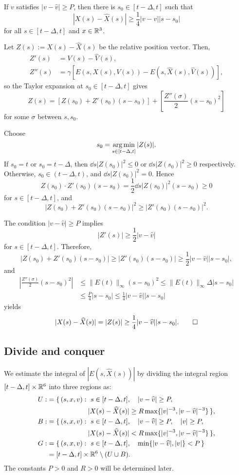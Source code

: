 \documentclass[11pt]{amsart}
\begin{document}
\begin{lem}
If $v$ satisfies $|v-\hat v|\ge P$, then there is $s_0\in[t-\Delta,t]$ such that
\[|X(s)-\hat X(s)|\ge\frac14|v-\hat v||s-s_0|\]
for all $s\in[t-\Delta,t]$ and $x\in\R^3$.
\end{lem}
\begin{pf}
Let $Z(s):=X(s)-\hat X(s)$ be the relative position vector.
Then,
\begin{align*}
Z'(s)&=V(s)-\hat V(s),\\
Z''(s)&=\gamma[E(s,X(s),V(s))-E(s,\hat X(s),\hat V(s))],
\end{align*}
so the Taylor expansion at $s_0\in[t-\Delta,t]$ gives
\[Z(s)=\left[Z(s_0)+Z'(s_0)(s-s_0)\right]+\left[\frac{Z''(\sigma)}2(s-s_0)^2\right]\]
for some $\sigma$ between $s,s_0$.

Choose
\[s_0=\argmin_{s\in[t-\Delta,t]}|Z(s)|.\]
If $s_0=t$ or $s_0=t-\Delta$, then $\dd{s}|Z(s_0)|^2\le0$ or $\dd{s}|Z(s_0)|^2\ge0$ respectively.
Otherwise, $s_0\in(t-\Delta,t)$, and $\dd{s}|Z(s_0)|^2=0$.
Hence
\[Z(s_0)\cdot Z'(s_0)(s-s_0)=\frac12\dd{s}|Z(s_0)|^2(s-s_0)\ge0\]
for $s\in[t-\Delta,t]$, and
\[|Z(s_0)+Z'(s_0)(s-s_0)|^2\ge|Z'(s_0)(s-s_0)|^2.\]

The condition $|v-\hat v|\ge P$ implies
\[|Z'(s)|\ge\frac12|v-\hat v|\]
for $s\in[t-\Delta,t]$.
Therefore,
\[|Z(s_0)+Z'(s_0)(s-s_0)|\ge|Z'(s_0)(s-s_0)|\ge\frac12|v-\hat v||s-s_0|,\]
and
\begin{align*}
|\frac{Z''(\sigma)}2(s-s_0)^2|
&\le\|E(t)\|_\infty(s-s_0)^2
\le\|E(t)\|_\infty\Delta|s-s_0|\\
&\le\frac P4|s-s_0|
\le\frac14|v-\hat v||s-s_0|
\end{align*}
yields
\[|X(s)-\hat X(s)|=|Z(s)|\ge\frac14|v-\hat v||s-s_0|.\qedhere\]
\end{pf}


\subsection{Divide and conquer}

We estimate the integral of $|E(s,\hat X(s))|$ by dividing the integral region $[t-\Delta,t]\x\R^6$ into three regions as:
\begin{align*}
U:&=\{\,(s,x,v):\ s\in[t-\Delta,t],\quad|v-\hat v|\ge P,\\
&\hspace{6em}|X(s)-\hat X(s)|\ge R\max\{|v|^{-3},|v-\hat v|^{-3}\}\,\},\\
B:&=\{\,(s,x,v):\ s\in[t-\Delta,t],\quad|v-\hat v|\ge P,\quad|v|\ge P,\\
&\hspace{6em}|X(s)-\hat X(s)|<R\max\{|v|^{-3},|v-\hat v|^{-3}\}\,\},\\
G:&=\{\,(s,x,v):\ s\in[t-\Delta,t],\quad\min\{|v-\hat v|,|v|\}<P\,\}\\
&=[t-\Delta,t]\x\R^6\setminus(U\cup B).
\end{align*}
The constants $P>0$ and $R>0$ will be determined later.
\end{document}
